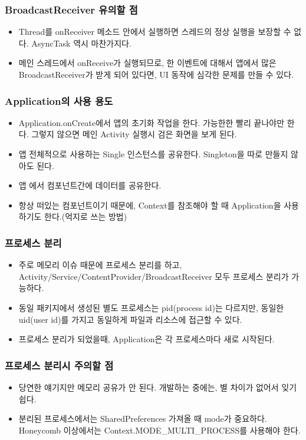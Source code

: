 \documentclass{beamer}
\begin{document}
\begin{frame}
\frametitle{BroadcastReceiver 유의할 점}
\begin{itemize}
\item Thread를 onReceiver 메소드 안에서 실행하면 스레드의 정상 실행을 보장할 수 없다. AsyncTask 역시 마찬가지다.
\item 메인 스레드에서 onReceive가 실행되므로, 한 이벤트에 대해서 앱에서 많은 BroadcastReceiver가 받게 되어 있다면, UI 동작에 심각한 문제를 만들 수 있다.
\end{itemize}
\end{frame}


\begin{frame}
\frametitle{Application의 사용 용도}
\begin{itemize}
\item Application.onCreate에서 앱의 초기화 작업을 한다. 가능한한 빨리 끝나야만 한다. 그렇지 않으면 메인 Activity 실행시 검은 화면을 보게 된다.
\item 앱 전체적으로 사용하는 Single 인스턴스를 공유한다. Singleton을 따로 만들지 않아도 된다.
\item 앱 에서 컴포넌트간에 데이터를 공유한다.
\item 항상 떠있는 컴포넌트이기 때문에, Context를 참조해야 할 때 Application을 사용하기도 한다.(억지로 쓰는 방법)
\end{itemize}
\end{frame}


\begin{frame}
\frametitle{프로세스 분리}
\begin{itemize}
\item 주로 메모리 이슈 때문에 프로세스 분리를 하고, Activity/Service/ContentProvider/BroadcastReceiver 모두 프로세스 분리가 가능하다.
\item 동일 패키지에서 생성된 별도 프로세스는 pid(process id)는 다르지만, 동일한 uid(user id)를 가지고 동일하게 파일과 리소스에 접근할 수 있다.
\item 프로세스 분리가 되었을때, Application은 각 프로세스마다 새로 시작된다.
\end{itemize}
\end{frame}

\begin{frame}
\frametitle{프로세스 분리시 주의할 점}
\begin{itemize}
\item 당연한 얘기지만 메모리 공유가 안 된다. 개발하는 중에는, 별 차이가 없어서 잊기 쉽다.
\item 분리된 프로세스에서는 SharedPreferences 가져올 때 mode가 중요하다. Honeycomb 이상에서는 Context.MODE\_MULTI\_PROCESS를 사용해야 한다.
\end{itemize}
\end{frame}
\end{document}
